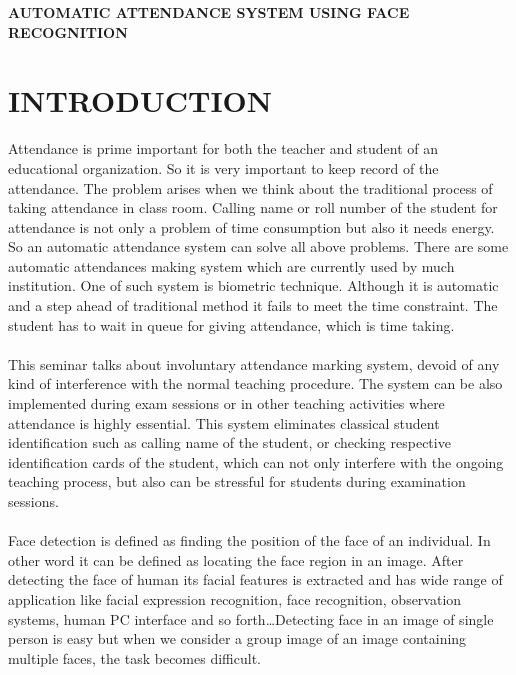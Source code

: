 \documentclass[a4paper, 12pt]{report}
\renewcommand{\baselinestretch}{1.5}
\begin{document}

\vspace*{\fill}
\begin{center}
\fontsize{22pt}{22pt}\selectfont
	{\bfseries  AUTOMATIC ATTENDANCE SYSTEM 
	USING FACE RECOGNITION}
	\fontsize{16pt}{16pt}\selectfont
\renewcommand{\baselinestretch}{1.5}
	\vspace*{\fill}
\end{center}






\newpage

\section{INTRODUCTION}
Attendance is prime important for both the teacher and student of an educational organization. So it is very important to keep record of the attendance. The problem arises when we think about the traditional process of taking attendance in class room. Calling name or roll number of the student for attendance is not only a problem of time consumption but also it needs energy. So an automatic attendance system can solve all above problems. There are some automatic attendances making system which are currently used by much institution. One of such system is biometric technique. Although it is automatic and a step ahead of traditional method it fails to meet the time constraint. The student has to wait in queue for giving attendance, which is time taking.\\
\paragraph{}This seminar talks about involuntary attendance marking system, devoid of any kind of interference with the normal teaching procedure. The system can be also implemented during exam sessions or in other teaching activities where attendance is highly essential. This system eliminates classical student identification such as calling name of the student, or checking respective identification cards of the student, which can not only interfere with the ongoing teaching process, but also can be stressful for students during examination sessions. \\
\paragraph{}Face detection is defined as finding the position of the face of an individual. In other word it can be defined as locating the face region in an image. After detecting the face of human its facial features is extracted and has wide range of application like facial expression recognition, face recognition, observation systems, human PC interface and so forth…Detecting face in an image of single person is easy but when we consider a group image of an image containing multiple faces, the task becomes difficult.
\newpage
\end{document}
